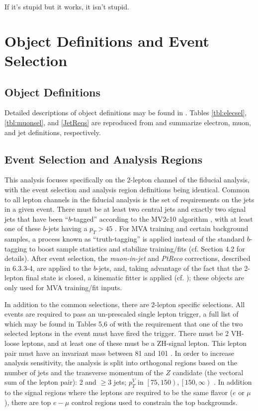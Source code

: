 \begin{savequote}[75mm]
If it's stupid but it works, it isn't stupid.
\end{savequote}

\chapter{Object Definitions and Event Selection}

\section{Object Definitions}
Detailed descriptions of object definitions may be found in \cite{objectnote}.  Tables \ref{tbl:elecsel}, \ref{tbl:muonsel}, and \ref{JetReqs} are reproduced from \cite{supportnote} and summarize electron, muon, and jet definitions, respectively.

 

\section{Event Selection and Analysis Regions}
This analysis focuses specifically on the 2-lepton channel of the fiducial analysis, with the event selection and analysis region definitions being identical.  Common to all lepton channels in the fiducial analysis is the set of requirements on the jets in a given event.  There must be at least two central jets and exactly two signal jets that have been ``$b$-tagged'' according to the MV2c10 algorithm \cite{btag}, with at least one of these $b$-jets having a $p_T>45$ \GeV.  For MVA training and certain background samples, a process known as ``truth-tagging'' is applied instead of the standard $b$-tagging to boost sample statistics and stabilize training/fits (cf. \cite{supportnote} Section 4.2 for details).  After event selection, the \emph{muon-in-jet} and \emph{PtReco} corrections, described in \cite{objectnote} 6.3.3-4, are applied to the $b$-jets, and, taking advantage of the fact that the 2-lepton final state is closed, a kinematic fitter is applied (cf. \cite{run1note,epsJetRes}); these objects are only used for MVA training/fit inputs.  

In addition to the common selections, there are 2-lepton specific selections.  All events are required to pass an un-prescaled single lepton trigger, a full list of which may be found in Tables 5,6 of \cite{objectnote} with the requirement that one of the two selected leptons in the event must have fired the trigger.  There must be 2 VH-loose leptons, and at least one of these must be a ZH-signal lepton.  This lepton pair must have an invariant mass between 81 and 101 \GeV.  In order to increase analysis sensitivity, the analysis is split into orthogonal regions based on the number of jets and the transverse momentum of the $Z$ candidate (the vectoral sum of the lepton pair): 2 and $\ge3$ jets; $p_T^V$ in $\left[75,150\right),\left[150,\infty\right)$ \GeV.  In addition to the signal regions where the leptons are required to be the same flavor ($e$ or $\mu$), there are top $e-\mu$ control regions used to constrain the top backgrounds.

